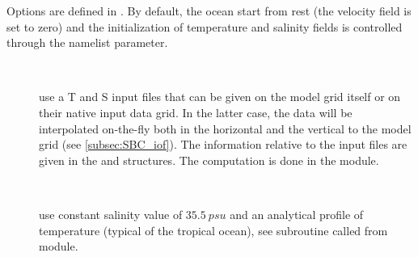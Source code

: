 \documentclass[../main/NEMO_manual]{subfiles}
\begin{document}

Options are defined in .
By default, the ocean start from rest (the velocity field is set to zero) and the initialization of temperature and
salinity fields is controlled through the  namelist parameter.
\begin{description}
\item[~]
  use a T and S input files that can be given on the model grid itself or on their native input data grid.
  In the latter case,
  the data will be interpolated on-the-fly both in the horizontal and the vertical to the model grid
  (see \autoref{subsec:SBC_iof}).
  The information relative to the input files are given in the  and  structures.
  The computation is done in the  module.
\item[~]
  use constant salinity value of $35.5~psu$ and an analytical profile of temperature
  (typical of the tropical ocean), see  subroutine called from  module.
\end{description}

\biblio

\pindex
\end{document}
